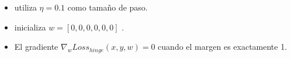 \documentclass[11pt,letterpaper]{article}
\begin{document}
\begin{itemize}
    \item utiliza \begin{math}
        \eta = 0.1
    \end{math}
    como tamaño de paso.

    \item inicializa \begin{math}
        w = [0,0,0,0,0,0]
    \end{math}
    .
    \item El gradiente \begin{math}
        \nabla_w Loss_{hinge}(x,y,w) = 0
    \end{math}
    cuando el margen es exactamente 1.
\end{itemize}
\end{document}

